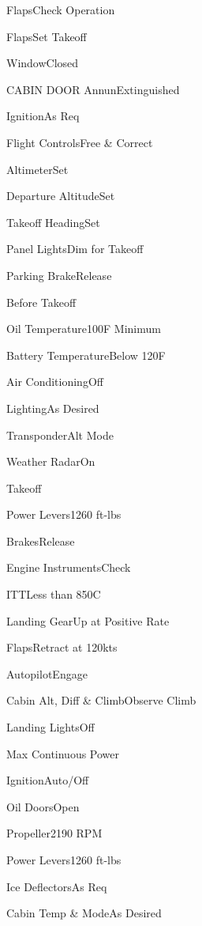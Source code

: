 \documentclass[sim-use]{checklist}
\begin{document}
\begin{checklist}{}    
  \item{Flaps}{Check Operation}
  \item{Flaps}{Set Takeoff}
  \item{Window}{Closed}
  \item{CABIN DOOR Annun}{Extinguished}
  \item{Ignition}{As Req}
  \item{Flight Controls}{Free \& Correct}
  \item{Altimeter}{Set}
  \item{Departure Altitude}{Set}
  \item{Takeoff Heading}{Set}
  \item{Panel Lights}{Dim for Takeoff}
  \item{Parking Brake}{Release}
\end{checklist}

\begin{checklist}{Before Takeoff}
  \item{Oil Temperature}{100F Minimum}
  \item{Battery Temperature}{Below 120F}
  \item{Air Conditioning}{Off}
  \item{Lighting}{As Desired}
  \item{Transponder}{Alt Mode}
  \item{Weather Radar}{On}
\end{checklist}

\begin{checklist}{Takeoff}
  \item{Power Levers}{1260 ft-lbs}
  \item{Brakes}{Release}
  \item{Engine Instruments}{Check}
  \item{ITT}{Less than 850C}
  \item{Landing Gear}{Up at Positive Rate}
  \item{Flaps}{Retract at 120kts}
  \item{Autopilot}{Engage}
  \item{Cabin Alt, Diff \& Climb}{Observe Climb}
  \item{Landing Lights}{Off}
\end{checklist}

\begin{checklist}{Max Continuous Power}
  \item{Ignition}{Auto/Off}
  \item{Oil Doors}{Open}
  \item{Propeller}{2190 RPM}
  \item{Power Levers}{1260 ft-lbs}
  \item{Ice Deflectors}{As Req}
  \item{Cabin Temp \& Mode}{As Desired}
\end{checklist}
\end{document}
